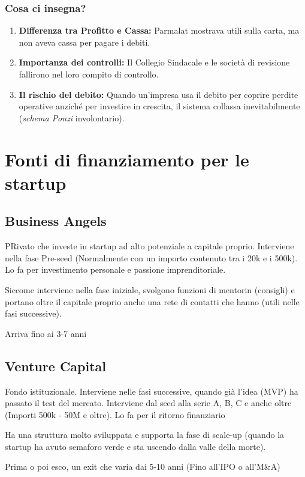 \documentclass[a4paper,12pt]{article}
\begin{document}
	\subsubsection{Cosa ci insegna?}
	\begin{enumerate}
		\item \textbf{Differenza tra Profitto e Cassa:} Parmalat mostrava utili sulla carta, ma non aveva cassa per pagare i debiti.
		\item \textbf{Importanza dei controlli:} Il Collegio Sindacale e le società di revisione fallirono nel loro compito di controllo.
		\item \textbf{Il rischio del debito:} Quando un'impresa usa il debito per coprire perdite operative anziché per investire in crescita, il sistema collassa inevitabilmente (\textit{schema Ponzi} involontario).
	\end{enumerate}
	
	\section{Fonti di finanziamento per le startup}
	\subsection{Business Angels}
	PRivato che investe in startup ad alto potenziale a capitale proprio.
	Interviene nella fase Pre-seed (Normalmente con un importo contenuto tra i 20k e i 500k). Lo fa per investimento personale e passione imprenditoriale.
	
	Siccome interviene nella fase iniziale, svolgono funzioni di mentorin (consigli) e portano oltre il capitale proprio anche una rete di contatti che hanno (utili nelle fasi successive).
	
	Arriva fino ai 3-7 anni
	
	\subsection{Venture Capital}
	Fondo istituzionale. Interviene nelle fasi successive, quando già l'idea (MVP) ha passato il test del mercato. Interviene dal seed alla serie A, B, C e anche oltre (Importi 500k - 50M e oltre). Lo fa per il ritorno finanziario
	
	Ha una struttura molto sviluppata e supporta la fase di scale-up (quando la startup ha avuto semaforo verde e sta uscendo dalla valle della morte).
	
	Prima o poi esco, un exit che varia dai 5-10 anni (Fino all'IPO o all'M\&A)
\end{document}
